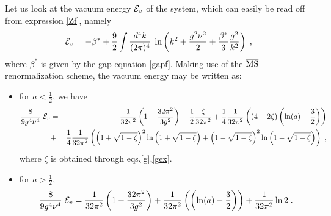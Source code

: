 Let us look at the vacuum energy ${\cal E}_v$ of the system, which  can easily be read off from expression \eqref{Zf}, namely
\begin{equation}
{\cal E}_v = - \beta^* + \frac{9}{2} \int \frac{d^4k}{(2\pi)^4} \; \ln\left( k^2 + \frac{g^2\nu^2}{2} +\frac{\beta^*}{3} \frac{g^2}{k^2} \right)  \;, \label{ev}
\end{equation}
where $\beta^*$ is given by the gap equation \eqref{gapf}. Making use of the $\overline{\mbox{MS}}$ renormalization scheme, the vacuum energy may be written as:
\begin{itemize}
\item  for $a<\frac{1}{2}$, we have
\begin{eqnarray}
\frac{8}{9 g^4\nu^4}\; {\cal E}_v & = &  \frac{1}{32\pi^2} \left( 1 - \frac{32\pi^2}{3g^2} \right) - \frac{1}{2} \frac{\zeta}{32\pi^2} + \frac{1}{4}\frac{1}{32\pi^2} \left(  (4-2\zeta)\left( \ln( a) -\frac{3}{2} \right) \right)  \\ \nonumber & + &  \frac{1}{4}\frac{1}{32\pi^2} \left(   \left( 1+ \sqrt{1-\zeta} \right)^2 \ln  \left( 1+ \sqrt{1-\zeta} \right)
+ \left( 1- \sqrt{1-\zeta} \right)^2 \ln  \left( 1- \sqrt{1-\zeta} \right)
 \right)     \;, \label{v1}
\end{eqnarray}
where $\zeta$ is obtained through eqs.\eqref{g},\eqref{gex}. 




\item for $a>\frac{1}{2}$,
\begin{equation}
\frac{8}{9 g^4\nu^4}\; {\cal E}_v  =   \frac{1}{32\pi^2} \left( 1 - \frac{32\pi^2}{3g^2} \right)  + \frac{1}{32\pi^2} \left(  \left( \ln( a) -\frac{3}{2} \right) \right)   +   \frac{1}{32\pi^2} \ln2    \;. \label{v2}
\end{equation}
\end{itemize}
